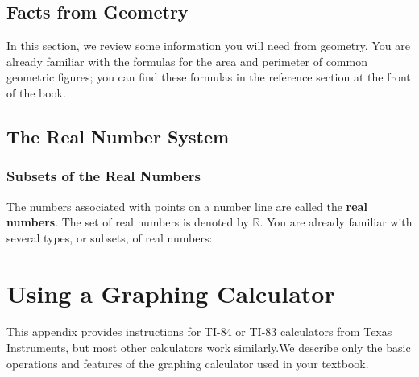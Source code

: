 \documentclass[10pt,]{book}
\newcommand{\terminology}[1]{\textbf{#1}}
\theoremstyle{plain}
\theoremstyle{definition}
\theoremstyle{definition}
\theoremstyle{definition}
\theoremstyle{definition}
\numberwithin{equation}{section}
\begin{document}
\section[Facts from Geometry]{Facts from Geometry}\label{appendix-Facts-from-Geometry}

            In this section, we review some information you will need from geometry. You are already familiar with the formulas for the area and perimeter of common geometric figures; you can find these formulas in the reference section at the front of the book.
\typeout{************************************************}
\typeout{************************************************}
\section[The Real Number System]{The Real Number System}\label{appendix-The-Real-Number-System}
\typeout{************************************************}
\typeout{************************************************}
\subsection[Subsets of the Real Numbers]{Subsets of the Real Numbers}\label{subsection-32}

            The numbers associated with points on a number line are called the \terminology{real numbers}. The set of real numbers is denoted by \(\mathbb{R}\). You are already familiar with several types, or subsets, of real numbers:
\typeout{************************************************}
\typeout{************************************************}
\chapter[Using a Graphing Calculator]{Using a Graphing Calculator}\label{appendix-2}
\typeout{************************************************}
\typeout{************************************************}
This appendix provides instructions for TI-84 or TI-83 calculators from Texas Instruments, but most other calculators work similarly.We describe only the basic operations and features of the graphing calculator used in your textbook.%
\typeout{************************************************}
\typeout{************************************************}
\end{document}
